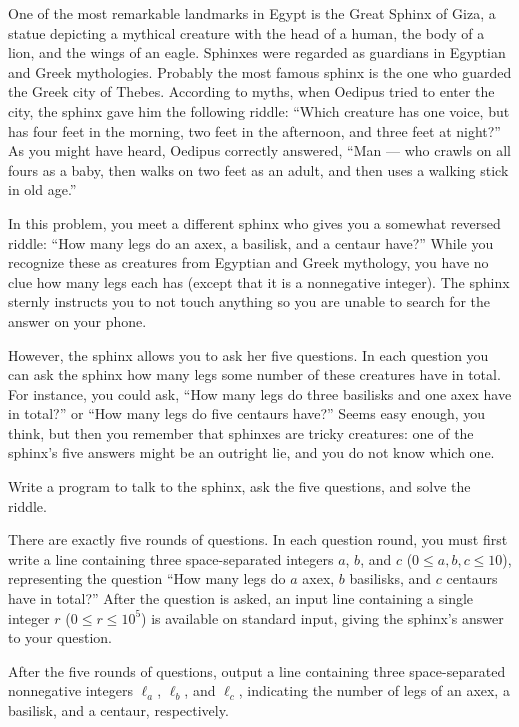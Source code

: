 
%
%
One of the most remarkable landmarks in Egypt is the Great Sphinx of
Giza, a statue depicting a mythical creature with the head of a human,
the body of a lion, and the wings of an eagle.  Sphinxes were regarded
as guardians in Egyptian and Greek mythologies.  Probably the most
famous sphinx is the one who guarded the Greek city of
Thebes. According to myths, when Oedipus tried to enter the city, the
sphinx gave him the following riddle: ``Which creature has one voice,
but has four feet in the morning, two feet in the afternoon, and three
feet at night?''  As you might have heard, Oedipus correctly answered,
``Man --- who crawls on all fours as a baby, then walks on two feet as
an adult, and then uses a walking stick in old age.''

In this problem, you meet a different sphinx who gives you a somewhat
reversed riddle: ``How many legs do an axex, a basilisk, and a centaur
have?''  While you recognize these as creatures from Egyptian and
Greek mythology, you have no clue how many legs each has (except that
it is a nonnegative integer).  The sphinx sternly instructs you to
not touch anything so you are unable to search for the answer on your
phone.

However, the sphinx allows you to ask her five questions.  In each
question you can ask the sphinx how many legs some number of these
creatures have in total.  For instance, you could ask, ``How many legs
do three basilisks and one axex have in total?'' or ``How many legs
do five centaurs have?''  Seems easy enough, you think, but then you
remember that sphinxes are tricky creatures: one of the sphinx's five
answers might be an outright lie, and you do not know which one.

Write a program to talk to the sphinx, ask the five questions, and
solve the riddle.

\begin{Interaction}
  There are exactly five rounds of questions.  In each question
  round, you must first write a line containing three space-separated
  integers $a$, $b$, and $c$ ($0 \le a, b, c \le 10$), representing
  the question ``How many legs do $a$ axex, $b$ basilisks, and $c$
  centaurs have in total?''  After the question is asked, an input line
  containing a single integer $r$ ($0 \le r \le 10^5$) is available on
  standard input, giving the sphinx's answer to your question.

  After the five rounds of questions, output a line containing three
  space-separated nonnegative integers $\ell_a$, $\ell_b$, and $\ell_c$,
  indicating the number of legs of an axex, a basilisk, and a centaur,
  respectively.
\end{Interaction}

\newpage
